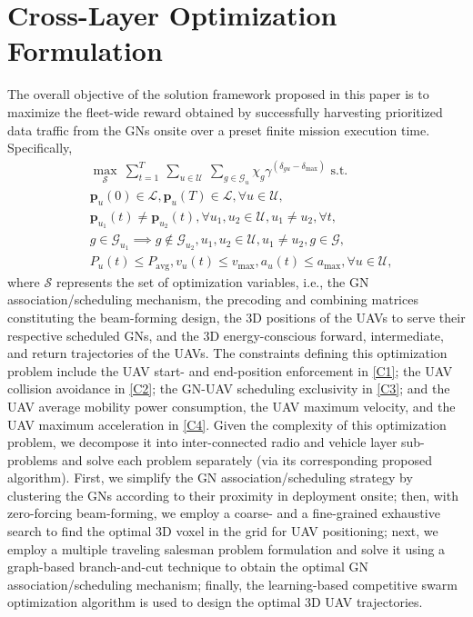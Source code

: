 \documentclass[10pt, twocolumn]{IEEEtran}
\begin{document}
\section{Cross-Layer Optimization Formulation}\label{S3}
The overall objective of the solution framework proposed in this paper is to maximize the fleet-wide reward obtained by successfully harvesting prioritized data traffic from the GNs onsite over a preset finite mission execution time. Specifically,
\begin{align}\label{Opt}
    &\max_{\mathcal{S}}\ \sum_{t=1}^{T}\ \sum_{u \in \mathcal{U}}\ \sum_{g \in \mathcal{G}_{u}}\chi_{g}\gamma^{(\delta_{gu} - \delta_{\mathrm{max}})} \text{ s.t. }\\
    &\mathbf{p}_{u}(0) \in \mathcal{L}, \mathbf{p}_{u}(T) \in \mathcal{L}, \forall u \in \mathcal{U},\label{C1}\tag{C.1}\\
    &\mathbf{p}_{u_{1}}(t) \neq \mathbf{p}_{u_{2}}(t), \forall u_{1}, u_{2} \in \mathcal{U}, u_{1} \neq u_{2}, \forall t,\label{C2}\tag{C.2}\\
    &g \in \mathcal{G}_{u_{1}}{\implies}g \notin \mathcal{G}_{u_{2}}, u_{1}, u_{2} \in \mathcal{U}, u_{1} \neq u_{2}, g \in \mathcal{G},\label{C3}\tag{C.3}\\
    &P_{u}(t) \leq P_{\mathrm{avg}}, v_{u}(t) \leq v_{\mathrm{max}}, a_{u}(t) \leq a_{\mathrm{max}}, \forall u \in \mathcal{U},\label{C4}\tag{C.4}
\end{align}
where $\mathcal{S}$ represents the set of optimization variables, i.e., the GN association/scheduling mechanism, the precoding and combining matrices constituting the beam-forming design, the $3$D positions of the UAVs to serve their respective scheduled GNs, and the $3$D energy-conscious forward, intermediate, and return trajectories of the UAVs. The constraints defining this optimization problem include the UAV start- and end-position enforcement in \eqref{C1}; the UAV collision avoidance in \eqref{C2}; the GN-UAV scheduling exclusivity in \eqref{C3}; and the UAV average mobility power consumption, the UAV maximum velocity, and the UAV maximum acceleration in \eqref{C4}. Given the complexity of this optimization problem, we decompose it into inter-connected radio and vehicle layer sub-problems and solve each problem separately (via its corresponding proposed algorithm). First, we simplify the GN association/scheduling strategy by clustering the GNs according to their proximity in deployment onsite; then, with zero-forcing beam-forming, we employ a coarse- and a fine-grained exhaustive search to find the optimal $3$D voxel in the grid for UAV positioning; next, we employ a multiple traveling salesman problem formulation and solve it using a graph-based branch-and-cut technique to obtain the optimal GN association/scheduling mechanism; finally, the learning-based competitive swarm optimization algorithm is used to design the optimal $3$D UAV trajectories.\\
\end{document}
